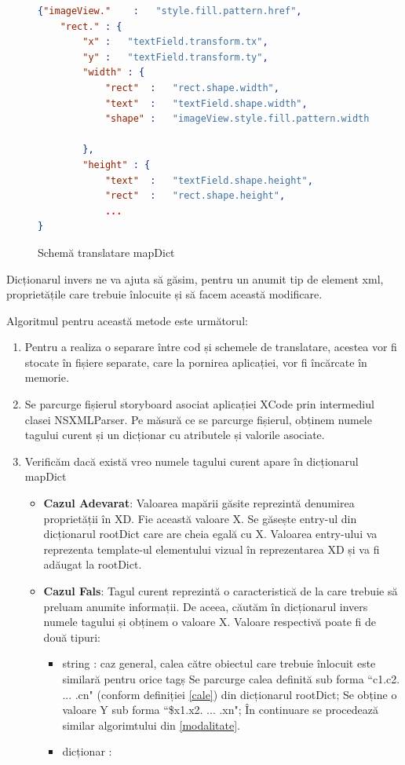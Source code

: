 \begin{figure}[!htbp]
\begin{lstlisting}[language=json,firstnumber=1]
{"imageView."    :   "style.fill.pattern.href",
    "rect." : {
        "x" :   "textField.transform.tx",
        "y" :   "textField.transform.ty",
        "width" : {
            "rect"  :   "rect.shape.width",
            "text"  :   "textField.shape.width",
            "shape" :   "imageView.style.fill.pattern.width"
        
        },
        "height" : {
            "text"  :   "textField.shape.height",
            "rect"  :   "rect.shape.height",
            ...
}
\end{lstlisting}
\caption{Schemă translatare mapDict} \label{fig:MapDict Schema}
\end{figure}


Dicționarul invers ne va ajuta să găsim, pentru un anumit tip de element xml, proprietățile care trebuie înlocuite și să facem această modificare. 

Algoritmul pentru această metode este următorul:

\begin{enumerate}
\item Pentru a realiza o separare între cod și schemele de translatare, acestea vor fi stocate în fișiere separate, care la pornirea aplicației, vor fi încărcate în memorie.
\item Se parcurge fișierul storyboard asociat aplicației XCode prin intermediul clasei NSXMLParser. Pe măsură ce se parcurge fișierul, obținem numele tagului curent și un dicționar cu atributele și valorile asociate.
\item Verificăm dacă există vreo numele tagului curent apare în dicționarul mapDict
\begin{itemize}
\item \textbf{Cazul Adevarat}: Valoarea mapării găsite reprezintă denumirea proprietății în XD. Fie această valoare X. Se găsește entry-ul din dicționarul rootDict care are cheia egală cu X. Valoarea entry-ului va reprezenta template-ul elementului vizual în reprezentarea XD și va fi adăugat la rootDict.
\item \textbf{Cazul Fals}: Tagul curent reprezintă o caracteristică de la care trebuie să preluam anumite informații. De aceea, căutăm în dicționarul invers numele tagului și obținem o valoare X. Valoare respectivă poate fi de două tipuri:
\begin{itemize}
\item string : caz general, calea către obiectul care trebuie înlocuit este similară pentru orice tagș Se parcurge calea definită sub forma ``c1.c2. ... .cn" (conform definiției \ref{cale}) din dicționarul rootDict; Se obține o valoare Y sub forma ``\$x1.x2. ... .xn"; În continuare se procedează similar algorimtului din \ref{modalitate}.
\item dicționar :
\end{itemize}
\end{itemize}
\end{enumerate}


